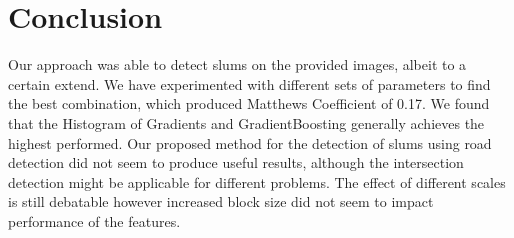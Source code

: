 \section{Conclusion}

Our approach was able to detect slums on the provided images, albeit to a certain extend. We have experimented with different sets of parameters to find the best combination, which produced Matthews Coefficient of 0.17. We found that the Histogram of Gradients and GradientBoosting generally achieves the highest performed. Our proposed method for the detection of slums using road detection did not seem to produce useful results, although the intersection detection might be applicable for different problems. The effect of different scales is still debatable however increased block size did not seem to impact performance of the features.









%
